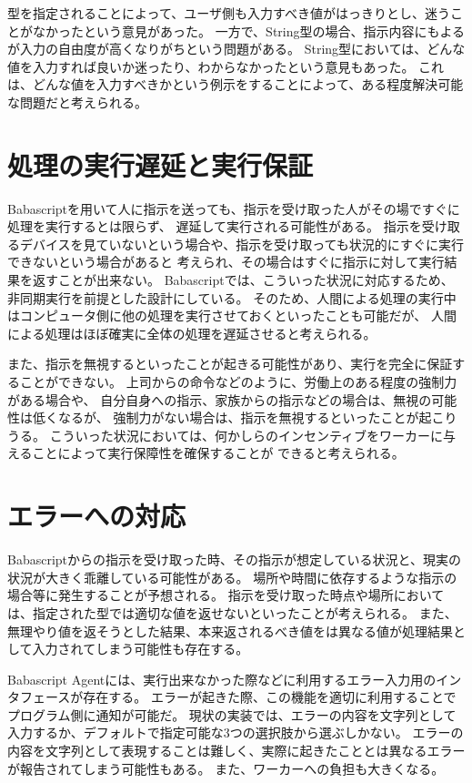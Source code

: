 型を指定されることによって、ユーザ側も入力すべき値がはっきりとし、迷うことがなかったという意見があった。
一方で、String型の場合、指示内容にもよるが入力の自由度が高くなりがちという問題がある。
String型においては、どんな値を入力すれば良いか迷ったり、わからなかったという意見もあった。
これは、どんな値を入力すべきかという例示をすることによって、ある程度解決可能な問題だと考えられる。

\section{処理の実行遅延と実行保証}\label{ux51e6ux7406ux306eux5b9fux884cux9045ux5ef6ux3068ux5b9fux884cux4fddux8a3c}

Babascriptを用いて人に指示を送っても、指示を受け取った人がその場ですぐに処理を実行するとは限らず、
遅延して実行される可能性がある。
指示を受け取るデバイスを見ていないという場合や、指示を受け取っても状況的にすぐに実行できないという場合があると
考えられ、その場合はすぐに指示に対して実行結果を返すことが出来ない。
Babascriptでは、こういった状況に対応するため、非同期実行を前提とした設計にしている。
そのため、人間による処理の実行中はコンピュータ側に他の処理を実行させておくといったことも可能だが、
人間による処理はほぼ確実に全体の処理を遅延させると考えられる。

また、指示を無視するといったことが起きる可能性があり、実行を完全に保証することができない。
上司からの命令などのように、労働上のある程度の強制力がある場合や、
自分自身への指示、家族からの指示などの場合は、無視の可能性は低くなるが、
強制力がない場合は、指示を無視するといったことが起こりうる。
こういった状況においては、何かしらのインセンティブをワーカーに与えることによって実行保障性を確保することが
できると考えられる。

\section{エラーへの対応}\label{ux30a8ux30e9ux30fcux3078ux306eux5bfeux5fdc}

Babascriptからの指示を受け取った時、その指示が想定している状況と、現実の状況が大きく乖離している可能性がある。
場所や時間に依存するような指示の場合等に発生することが予想される。
指示を受け取った時点や場所においては、指定された型では適切な値を返せないといったことが考えられる。
また、無理やり値を返そうとした結果、本来返されるべき値をは異なる値が処理結果として入力されてしまう可能性も存在する。

Babascript
Agentには、実行出来なかった際などに利用するエラー入力用のインタフェースが存在する。
エラーが起きた際、この機能を適切に利用することでプログラム側に通知が可能だ。
現状の実装では、エラーの内容を文字列として入力するか、デフォルトで指定可能な3つの選択肢から選ぶしかない。
エラーの内容を文字列として表現することは難しく、実際に起きたこととは異なるエラーが報告されてしまう可能性もある。
また、ワーカーへの負担も大きくなる。

